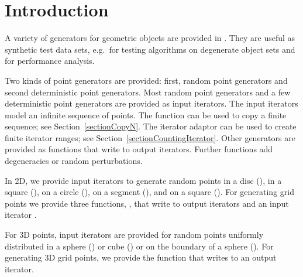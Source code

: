 


\section{Introduction}
A variety of generators for geometric objects are provided in \cgal.
They are useful as synthetic test data sets, e.g.~for testing
algorithms on degenerate object sets and for performance analysis.

Two kinds of point generators are provided: first, random point
generators and second deterministic point generators. Most random
point generators and a few deterministic point generators are provided
as input iterators.  The input iterators model an infinite sequence of
points. The function  can be used to copy a
finite sequence; see Section~\ref{sectionCopyN}. The iterator adaptor
 can be used to create finite iterator
ranges; see Section~\ref{sectionCountingIterator}.
Other generators are provided as functions that write to output
iterators. Further functions add degeneracies or random perturbations.

In 2D, we provide input iterators to generate random points in a disc
(), 
in a square (),
on a circle (), 
on a segment (),
and on a square ().
For generating grid points we provide three functions,
,
 that write to output iterators and
an input iterator .

For 3D points, input iterators are provided for random points uniformly 
distributed in a sphere ()
or cube () or on the boundary of a sphere
().
For generating 3D grid points, we provide the function 
 that writes to
an output iterator.

